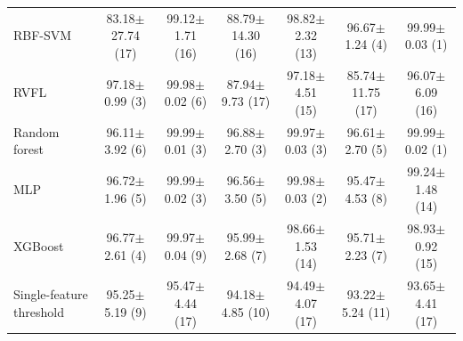 \begin{tabular}{l*{6}{c}}
RBF-SVM & 83.18$\pm$27.74 (17) & 99.12$\pm$1.71 (16) & 88.79$\pm$14.30 (16) & 98.82$\pm$2.32 (13) & 96.67$\pm$1.24 (4) & 99.99$\pm$0.03 (1) \\
RVFL & 97.18$\pm$0.99 (3) & 99.98$\pm$0.02 (6) & 87.94$\pm$9.73 (17) & 97.18$\pm$4.51 (15) & 85.74$\pm$11.75 (17) & 96.07$\pm$6.09 (16) \\
Random forest & 96.11$\pm$3.92 (6) & 99.99$\pm$0.01 (3) & 96.88$\pm$2.70 (3) & 99.97$\pm$0.03 (3) & 96.61$\pm$2.70 (5) & 99.99$\pm$0.02 (1) \\
MLP & 96.72$\pm$1.96 (5) & 99.99$\pm$0.02 (3) & 96.56$\pm$3.50 (5) & 99.98$\pm$0.03 (2) & 95.47$\pm$4.53 (8) & 99.24$\pm$1.48 (14) \\
XGBoost & 96.77$\pm$2.61 (4) & 99.97$\pm$0.04 (9) & 95.99$\pm$2.68 (7) & 98.66$\pm$1.53 (14) & 95.71$\pm$2.23 (7) & 98.93$\pm$0.92 (15) \\
Single-feature threshold & 95.25$\pm$5.19 (9) & 95.47$\pm$4.44 (17) & 94.18$\pm$4.85 (10) & 94.49$\pm$4.07 (17) & 93.22$\pm$5.24 (11) & 93.65$\pm$4.41 (17) \\
\bottomrule
\end{tabular}
